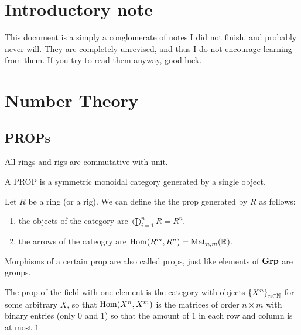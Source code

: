 \documentclass[11pt,a4paper]{article}
\begin{document}
\maketitle


\newpage
\tableofcontents
\newpage

\setcounter{section}{-1}

\section{Introductory note}
This document is a simply a conglomerate of notes I did not finish,
and probably never will.
They are completely unrevised, and thus I do not encourage learning
from them.
If you try to read them anyway, good luck.

\newpage

\section{Number Theory}
\subsection{PROPs}
\begin{remark}
  All rings and rigs are commutative with unit.
\end{remark}

\begin{definition}[PROP]
  A PROP is a symmetric monoidal category generated by a single object.
\end{definition}

\begin{example}
  Let $R$ be a ring (or a rig).
  We can define the the prop generated by $R$ as follows:
  \begin{enumerate}
    \item[(1)] the objects of the category are $\bigoplus_{i=1}^{n} R = R^n$.
    \item[(2)] the arrows of the cateogry are $\operatorname{Hom}(R^m,R^n) = \operatorname{Mat}_{n,m}(\mathbb{R})$.
  \end{enumerate}
  Morphisms of a certain prop are also called props,
  just like elements of $\mathbf{Grp}$ are groups.
\end{example}

\begin{example}
  The prop of the field with one element is the category with objects
  $\left\{X^n\right\}_{n \in \mathbb{N}}$ for some arbitrary $X$,
  so that $\operatorname{Hom}(X^n,X^m)$ is the matrices of order $n \times m$
  with binary entries (only $0$ and $1$) so that the amount of $1$
  in each row and column is at most $1$.
\end{example}
\end{document}
